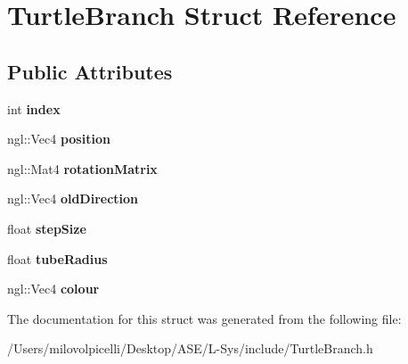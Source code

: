 \hypertarget{struct_turtle_branch}{}\section{Turtle\+Branch Struct Reference}
\label{struct_turtle_branch}
\subsection*{Public Attributes}
\begin{DoxyCompactItemize}
\item 
\mbox{\label{struct_turtle_branch_af10d90bc16407a8fd0d8d94f38dc9c09}} 
int {\bfseries index}
\item 
\mbox{\label{struct_turtle_branch_abb88828bc51aac907a3dd7da2822842b}} 
ngl\+::\+Vec4 {\bfseries position}
\item 
\mbox{\label{struct_turtle_branch_a720e47085965ef5a95f0164a039ed31b}} 
ngl\+::\+Mat4 {\bfseries rotation\+Matrix}
\item 
\mbox{\label{struct_turtle_branch_a5b002f10dcac69dc8a6327c7a1064af9}} 
ngl\+::\+Vec4 {\bfseries old\+Direction}
\item 
\mbox{\label{struct_turtle_branch_a2238a245c65a2140019493dbd029d304}} 
float {\bfseries step\+Size}
\item 
\mbox{\label{struct_turtle_branch_a6c6ccd52ce942b9b45349c8fce6ccff1}} 
float {\bfseries tube\+Radius}
\item 
\mbox{\label{struct_turtle_branch_af2c7f766d18485499a5321470970ea52}} 
ngl\+::\+Vec4 {\bfseries colour}
\end{DoxyCompactItemize}


The documentation for this struct was generated from the following file\+:\begin{DoxyCompactItemize}
\item 
/\+Users/milovolpicelli/\+Desktop/\+A\+S\+E/\+L-\/\+Sys/include/Turtle\+Branch.\+h\end{DoxyCompactItemize}
